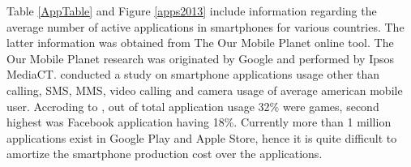 \documentclass[conference]{IEEEtran}
\begin{document}

Table \ref{AppTable} and Figure \ref{apps2013} include information regarding the average number of active applications in smartphones for various countries. The latter information was obtained from The Our Mobile Planet online tool. The Our Mobile Planet research was originated by Google and performed by Ipsos MediaCT. \cite{Flurry} conducted a study on smartphone applications usage other than calling, SMS, MMS, video calling and camera usage of average american mobile user. Accroding to \cite{Flurry}, out of total application usage 32\% were games, second highest was Facebook application having 18\%. Currently more than 1 million applications exist in Google Play and Apple Store, hence it is quite difficult to amortize the smartphone production cost over the applications.
\end{document}
